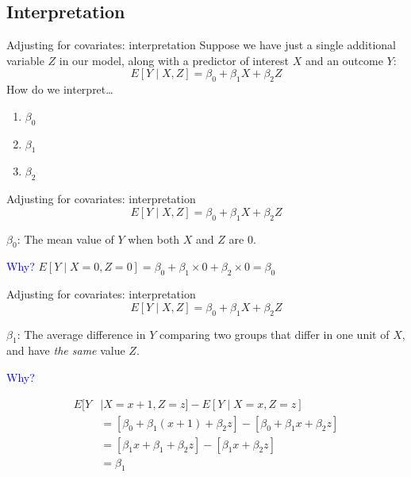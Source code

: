 \documentclass[10pt,t]{beamer}
\begin{document}

\subsection{Interpretation}

\begin{frame}{Adjusting for covariates: interpretation}
Suppose we have just a single additional variable $Z$ in our model, along with a predictor of interest $X$ and an outcome $Y$:
$$
E[Y \mid X, Z] = \beta_0 + \beta_1 X + \beta_2 Z
$$\pause
How do we interpret\dots
\vspace{0.3cm}
\begin{enumerate}
	\item[] $\beta_0$
	\item[] $\beta_1$
	\item[] $\beta_2$
\end{enumerate}
\end{frame}

\begin{frame}{Adjusting for covariates: interpretation}
$$
E[Y \mid X, Z] = \beta_0 + \beta_1 X + \beta_2 Z
$$

\vspace{0.3cm}

$\beta_0$: The mean value of $Y$ when both $X$ and $Z$ are 0.

\vspace{0.3cm}

\textcolor{blue}{Why?} \pause $E[Y \mid X = 0, Z = 0] = \beta_0 + \beta_1 \times 0 + \beta_2 \times 0 = \beta_0$
\end{frame}

\begin{frame}{Adjusting for covariates: interpretation}
$$
E[Y \mid X, Z] = \beta_0 + \beta_1 X + \beta_2 Z
$$

\vspace{0.3cm}

$\beta_1$: The average difference in $Y$ comparing two groups that differ in one unit of $X$, and have \textit{the same} value $Z$.

\vspace{0.3cm}

\textcolor{blue}{Why?} \pause 

\begin{align*}
E[Y & \mid X = x + 1, Z = z] - E[Y \mid X = x, Z = z] \\
& = [\beta_0 + \beta_1(x + 1) + \beta_2 z] - [\beta_0 + \beta_1x + \beta_2 z] \\
& = [\beta_1 x + \beta_1 + \beta_2 z] - [\beta_1 x + \beta_2 z] \\
& = \beta_1
\end{align*}

\end{frame}
\end{document}
